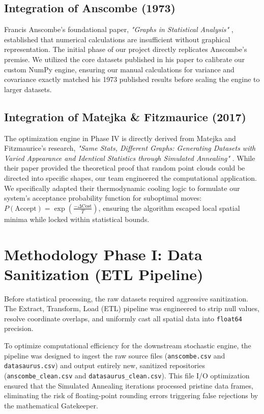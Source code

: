 \documentclass[12pt, a4paper]{article}
\begin{document}
\subsection{Integration of Anscombe (1973)}
Francis Anscombe's foundational paper, \textit{"Graphs in Statistical Analysis"} \cite{anscombe1973}, established that numerical calculations are insufficient without graphical representation. The initial phase of our project directly replicates Anscombe's premise. We utilized the core datasets published in his paper to calibrate our custom NumPy engine, ensuring our manual calculations for variance and covariance exactly matched his 1973 published results before scaling the engine to larger datasets.

\subsection{Integration of Matejka \& Fitzmaurice (2017)}
The optimization engine in Phase IV is directly derived from Matejka and Fitzmaurice's research, \textit{"Same Stats, Different Graphs: Generating Datasets with Varied Appearance and Identical Statistics through Simulated Annealing"} \cite{matejka2017}. While their paper provided the theoretical proof that random point clouds could be directed into specific shapes, our team engineered the computational application. We specifically adapted their thermodynamic cooling logic to formulate our system's acceptance probability function for suboptimal moves: $P(\text{Accept}) = \exp\left(\frac{-\Delta \text{Cost}}{T}\right)$, ensuring the algorithm escaped local spatial minima while locked within statistical bounds.

\section{Methodology Phase I: Data Sanitization (ETL Pipeline)}
Before statistical processing, the raw datasets required aggressive sanitization. The Extract, Transform, Load (ETL) pipeline was engineered to strip null values, resolve coordinate overlaps, and uniformly cast all spatial data into \texttt{float64} precision. 

To optimize computational efficiency for the downstream stochastic engine, the pipeline was designed to ingest the raw source files (\texttt{anscombe.csv} and \texttt{datasaurus.csv}) and output entirely new, sanitized repositories (\texttt{anscombe\_clean.csv} and \texttt{datasaurus\_clean.csv}). This file I/O optimization ensured that the Simulated Annealing iterations processed pristine data frames, eliminating the risk of floating-point rounding errors triggering false rejections by the mathematical Gatekeeper.
\end{document}
